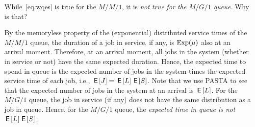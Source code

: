 \documentclass[stochastic-or.tex]{subfiles}
\begin{document}
\begin{exercise}\label{ex:l-216}
While~\cref{eq:wqes} is true for the $M/M/1$, it is \emph{not true for the $M/G/1$ queue}. Why is that?
\begin{solution}
 By the memoryless property of the (exponential) distributed service times of the $M/M/1$ queue, the duration of a job in service, if any, is $\mathrm{Exp}(\mu)$ also at an arrival moment.
 Therefore, at an arrival moment, all jobs in the system (whether in service or not) have the same expected duration.
 Hence, the expected time to spend in queue is the expected number of jobs in the system times the expected service time of each job, i.e., $\,\mathsf{E}\left[J\right] = \,\mathsf{E}\left[L\right] \,\mathsf{E}\left[S\right]$.
 Note that we use PASTA to see that the expected number of jobs in the system at an arrival is $\,\mathsf{E}\left[L\right]$.
 For the $M/G/1$ queue, the job in service (if any) does not have the same distribution as a job in queue.
 Hence, for the $M/G/1$ queue, the \emph{expected time in queue is not} $\,\mathsf{E}\left[L\right] \,\mathsf{E}\left[S\right]$.
\end{solution}
\end{exercise}



\end{document}
